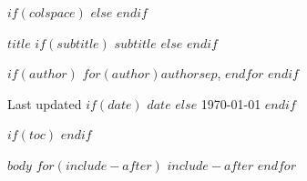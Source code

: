 \documentclass[$if(fontsize)$$fontsize$,$endif$$if(lang)$$lang$,$endif$$if(papersize)$$papersize$,$endif$$for(classoption)$$classoption$$sep$,$endfor$]{$documentclass$}
\begin{document}
\pagestyle{projectnum}
\thispagestyle{firstpage}
\afterpage{\aftergroup\restoregeometry}

$if(colspace)$
\setlength{\tabcolsep}{$colspace$}
$else$
\setlength{\tabcolsep}{12pt}
$endif$

\Large
{\sbf $title$}\newline
$if(subtitle)$
{\sf\normalsize $subtitle$}
$else$
$endif$

\sf\normalsize{
$if(author)$
$for(author)$$author$$sep$, $endfor$\newline
$endif$
}

Last updated $if(date)$
$date$
$else$
\today
$endif$
\vspace{5mm}



$if(toc)$
\setcounter{page}{1}
\setcounter{tocdepth}{2}
\tableofcontents
$endif$


$body$
$for(include-after)$
$include-after$
$endfor$
\end{document}
